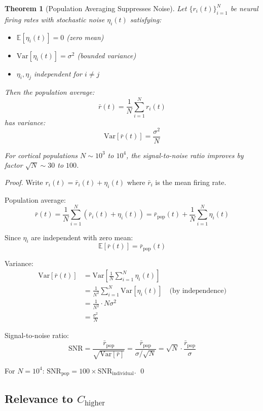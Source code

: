 \documentclass[11pt]{article}
\newtheorem{theorem}{Theorem}[section]
\begin{document}
\begin{theorem}[Population Averaging Suppresses Noise]\label{thm:noise_suppression}
Let $\{r_i(t)\}_{i=1}^N$ be neural firing rates with stochastic noise $\eta_i(t)$ satisfying:
\begin{itemize}
\item $\mathbb{E}[\eta_i(t)] = 0$ (zero mean)
\item $\text{Var}[\eta_i(t)] = \sigma^2$ (bounded variance)
\item $\eta_i, \eta_j$ independent for $i \neq j$
\end{itemize}

Then the population average:
\[
\bar{r}(t) = \frac{1}{N} \sum_{i=1}^N r_i(t)
\]
has variance:
\[
\text{Var}[\bar{r}(t)] = \frac{\sigma^2}{N}
\]

For cortical populations $N \sim 10^3$ to $10^4$, the signal-to-noise ratio improves by factor $\sqrt{N} \sim 30$ to $100$.
\end{theorem}

\begin{proof}
Write $r_i(t) = \bar{r}_i(t) + \eta_i(t)$ where $\bar{r}_i$ is the mean firing rate.

Population average:
\[
\bar{r}(t) = \frac{1}{N} \sum_{i=1}^N (\bar{r}_i(t) + \eta_i(t)) = \bar{r}_{\text{pop}}(t) + \frac{1}{N}\sum_{i=1}^N \eta_i(t)
\]

Since $\eta_i$ are independent with zero mean:
\[
\mathbb{E}[\bar{r}(t)] = \bar{r}_{\text{pop}}(t)
\]

Variance:
\begin{align*}
\text{Var}[\bar{r}(t)] &= \text{Var}\left[\frac{1}{N}\sum_{i=1}^N \eta_i(t)\right]\\
&= \frac{1}{N^2} \sum_{i=1}^N \text{Var}[\eta_i(t)] \quad \text{(by independence)}\\
&= \frac{1}{N^2} \cdot N\sigma^2\\
&= \frac{\sigma^2}{N}
\end{align*}

Signal-to-noise ratio:
\[
\text{SNR} = \frac{\bar{r}_{\text{pop}}}{\sqrt{\text{Var}[\bar{r}]}} = \frac{\bar{r}_{\text{pop}}}{\sigma/\sqrt{N}} = \sqrt{N} \cdot \frac{\bar{r}_{\text{pop}}}{\sigma}
\]

For $N = 10^4$: $\text{SNR}_{\text{pop}} = 100 \times \text{SNR}_{\text{individual}}$. \qed
\end{proof}

\subsection{Relevance to $C_{\text{higher}}$}
\end{document}
